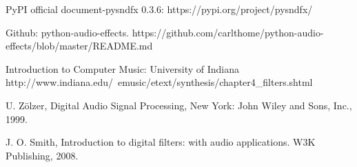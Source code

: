 \documentclass[runningheads,a4paper]{llncs}
\begin{document}
\begin{thebibliography}{4}








 PyPI official document-pysndfx 0.3.6: https://pypi.org/project/pysndfx/ 

 Github: python-audio-effects. https://github.com/carlthome/python-audio-effects/blob/master/README.md

 Introduction to Computer Music: University of Indiana
http://www.indiana.edu/~emusic/etext/synthesis/chapter4_filters.shtml

 U. Zölzer, Digital Audio Signal Processing, 
New York: John Wiley and Sons, Inc., 1999.

 J. O. Smith, Introduction to digital filters: with audio applications. W3K Publishing, 2008.




\end{thebibliography}



\end{document}
